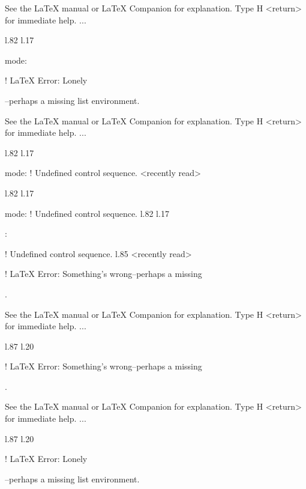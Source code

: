{{{{{{{{{{{{{{{{{See the LaTeX manual or LaTeX Companion for explanation.
Type  H <return>  for immediate help.
 ...                                              
                                                  
l.82 l.17     \item \xmlNode
                            {mode}: \xmlDesc

! LaTeX Error: Lonely \item--perhaps a missing list environment.

See the LaTeX manual or LaTeX Companion for explanation.
Type  H <return>  for immediate help.
 ...                                              
                                                  
l.82 l.17     \item \xmlNode
                            {mode}: \xmlDesc
! Undefined control sequence.
<recently read> \xmlNode 
                         
l.82 l.17     \item \xmlNode
                            {mode}: \xmlDesc
! Undefined control sequence.
l.82 l.17     \item {}: \xmlDesc
                                            
! Undefined control sequence.
l.85 <recently read> \xmlNode
                             

! LaTeX Error: Something's wrong--perhaps a missing \item.

See the LaTeX manual or LaTeX Companion for explanation.
Type  H <return>  for immediate help.
 ...                                              
                                                  
l.87 l.20     \item \xmlNode
                            

! LaTeX Error: Something's wrong--perhaps a missing \item.

See the LaTeX manual or LaTeX Companion for explanation.
Type  H <return>  for immediate help.
 ...                                              
                                                  
l.87 l.20     \item \xmlNode
                            

! LaTeX Error: Lonely \item--perhaps a missing list environment.

}}}}}}}}}}}}}}}}}

